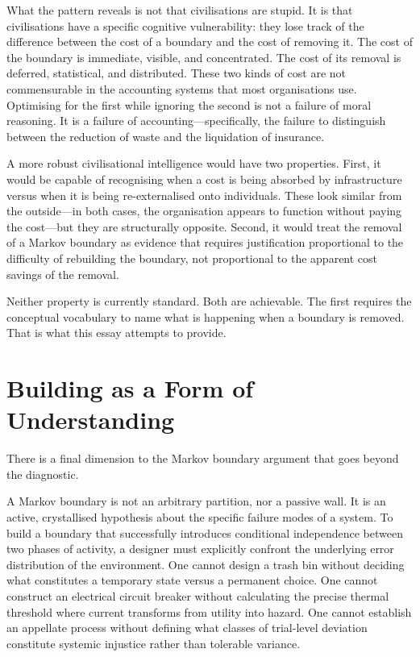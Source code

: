 \documentclass[12pt, a4paper]{article}
\begin{document}
What the pattern reveals is not that civilisations are stupid. It is
that civilisations have a specific cognitive vulnerability: they lose
track of the difference between the cost of a boundary and the cost of
removing it. The cost of the boundary is immediate, visible, and
concentrated. The cost of its removal is deferred, statistical, and
distributed. These two kinds of cost are not commensurable in the
accounting systems that most organisations use. Optimising for the
first while ignoring the second is not a failure of moral reasoning.
It is a failure of accounting---specifically, the failure to
distinguish between the reduction of waste and the liquidation of
insurance.

A more robust civilisational intelligence would have two properties.
First, it would be capable of recognising when a cost is being
absorbed by infrastructure versus when it is being re-externalised
onto individuals. These look similar from the outside---in both cases,
the organisation appears to function without paying the cost---but
they are structurally opposite. Second, it would treat the removal of
a Markov boundary as evidence that requires justification proportional
to the difficulty of rebuilding the boundary, not proportional to the
apparent cost savings of the removal.

Neither property is currently standard. Both are achievable. The
first requires the conceptual vocabulary to name what is happening
when a boundary is removed. That is what this essay attempts to
provide.

\section{Building as a Form of Understanding}

There is a final dimension to the Markov boundary argument that goes
beyond the diagnostic.

A Markov boundary is not an arbitrary partition, nor a passive wall.
It is an active, crystallised hypothesis about the specific failure
modes of a system. To build a boundary that successfully introduces
conditional independence between two phases of activity, a designer
must explicitly confront the underlying error distribution of the
environment. One cannot design a trash bin without deciding what
constitutes a temporary state versus a permanent choice. One cannot
construct an electrical circuit breaker without calculating the
precise thermal threshold where current transforms from utility into
hazard. One cannot establish an appellate process without defining
what classes of trial-level deviation constitute systemic injustice
rather than tolerable variance.
\end{document}
